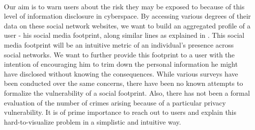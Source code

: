 \documentclass[11pt]{article}
\begin{document}
\paragraph{}
Our aim is to warn users about the risk they may be exposed to because of this level of information disclosure in cyberspace. By accessing various degrees of their data on these social network websites, we want to build an aggregated profile of a user - his social media footprint, along similar lines as explained in \cite{emergingthreat}. This social media footprint will be an intuitive metric of an individual’s presence across social networks. We want to further provide this footprint to a user with the intention of encouraging him to trim down the personal information he might have disclosed without knowing the consequences. While various surveys have been conducted over the same concerns, there have been no known attempts to formalize the vulnerability of a social footprint. Also, there has not been a formal evaluation of the number of crimes arising because of a particular privacy vulnerability. It is of prime importance to reach out to users and explain this hard-to-visualize problem in a simplistic and intuitive way.
\end{document}
